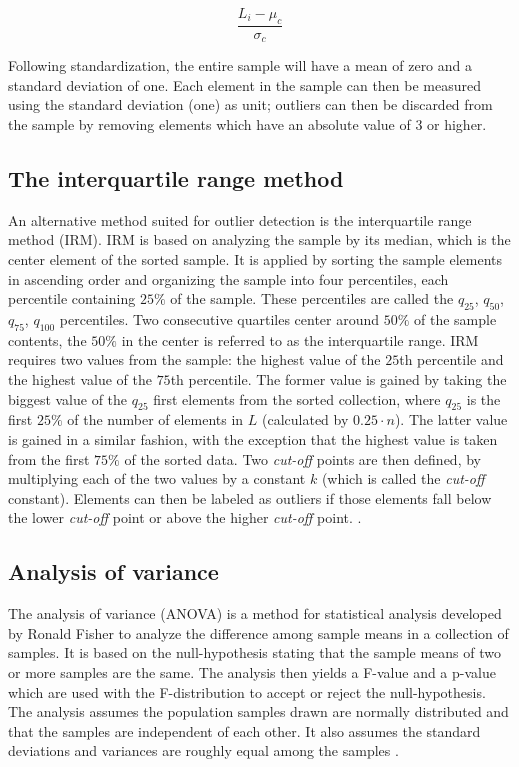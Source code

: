 \begin{equation}
\label{eqn:zscore}
 \frac{L_i - \mu_c} {\sigma_c}
\end{equation}

Following standardization, the entire sample will have a mean of zero and a standard deviation of one. Each element in the sample can then be measured using the standard deviation (one) as unit; outliers can then be discarded from the sample by removing elements which have an absolute value of 3 or higher.


\subsection{The interquartile range method}
An alternative method suited for outlier detection is the interquartile range method (IRM). IRM is based on analyzing the sample by its median, which is the center element of the sorted sample. It is applied by sorting the sample elements in ascending order and organizing the sample into four percentiles, each percentile containing $25\%$ of the sample. These percentiles are called the $q_{25}$, $q_{50}$, $q_{75}$, $q_{100}$ percentiles. Two consecutive quartiles center around $50\%$ of the sample contents, the $50\%$ in the center is referred to as the interquartile range. IRM requires two values from the sample: the highest value of the $25$th percentile and the highest value of the $75$th percentile. The former value is gained by taking the biggest value of the $q_{25}$ first elements from the sorted collection, where $q_{25}$ is the first $25\%$ of the number of elements in $L$ (calculated by $0.25 \cdot n$). The latter value is gained in a similar fashion, with the exception that the highest value is taken from the first $75\%$ of the sorted data. Two \textit{cut-off} points are then defined, by multiplying each of the two values by a constant $k$ (which is called the \textit{cut-off} constant). Elements can then be labeled as outliers if those elements fall below the lower \textit{cut-off} point or above the higher \textit{cut-off} point. \cite{vinutha2018detection, walfish2006review, dovoedo2015boxplot}.

\subsection{Analysis of variance}

The analysis of variance (ANOVA) is a method for statistical analysis developed by Ronald Fisher to analyze the difference among sample means in a collection of samples. It is based on the null-hypothesis stating that the sample means of two or more samples are the same. The analysis then yields a F-value and a p-value which are used with the F-distribution to accept or reject the null-hypothesis. The analysis assumes the population samples drawn are normally distributed and that the samples are independent of each other. It also assumes the standard deviations and variances are roughly equal among the samples \cite{scheffe1999analysis}.

